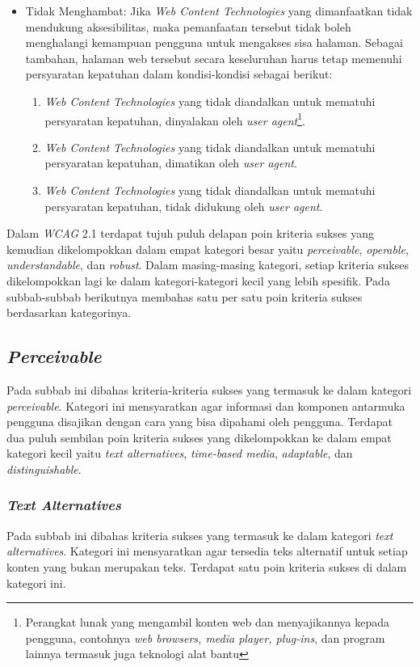 \begin{itemize}
	\item Tidak Menghambat: Jika \textit{Web Content Technologies} yang dimanfaatkan tidak mendukung aksesibilitas, maka pemanfaatan tersebut tidak boleh menghalangi kemampuan pengguna untuk mengakses sisa halaman. Sebagai tambahan, halaman web tersebut secara keseluruhan harus tetap memenuhi persyaratan kepatuhan dalam kondisi-kondisi sebagai berikut:
	\begin{enumerate}
		\item \textit{Web Content Technologies} yang tidak diandalkan untuk mematuhi persyaratan kepatuhan, dinyalakan oleh \textit{user agent}\footnote{Perangkat lunak yang mengambil konten web dan menyajikannya kepada pengguna, contohnya \textit{web browsers, media player, plug-ins}, dan program lainnya termasuk juga teknologi alat bantu}.
		\item \textit{Web Content Technologies} yang tidak diandalkan untuk mematuhi persyaratan kepatuhan, dimatikan oleh \textit{user agent}.
		\item \textit{Web Content Technologies} yang tidak diandalkan untuk mematuhi persyaratan kepatuhan, tidak didukung oleh \textit{user agent}.
	\end{enumerate}
\end{itemize}

Dalam \textit{WCAG} 2.1 terdapat tujuh puluh delapan poin kriteria sukses yang kemudian dikelompokkan dalam empat kategori besar yaitu \textit{perceivable}, \textit{operable}, \textit{understandable}, dan \textit{robust}. Dalam masing-masing kategori, setiap kriteria sukses dikelompokkan lagi ke dalam kategori-kategori kecil yang lebih spesifik. Pada subbab-subbab berikutnya membahas satu per satu poin kriteria sukses berdasarkan kategorinya.

\subsection{\textit{Perceivable}}
\label{sec:perceivable}
Pada subbab ini dibahas kriteria-kriteria sukses yang termasuk ke dalam kategori \textit{perceivable}. Kategori ini mensyaratkan agar informasi dan komponen antarmuka pengguna disajikan dengan cara yang bisa dipahami oleh pengguna. Terdapat dua puluh sembilan poin kriteria sukses yang dikelompokkan ke dalam empat kategori kecil yaitu \textit{text alternatives}, \textit{time-based media}, \textit{adaptable}, dan \textit{distinguishable}.

\subsubsection{\textit{Text Alternatives}}
\label{sec:text_alternatives}
Pada subbab ini dibahas kriteria sukses yang termasuk ke dalam kategori \textit{text alternatives}. Kategori ini mensyaratkan agar tersedia teks alternatif untuk setiap konten yang bukan merupakan teks. Terdapat satu poin kriteria sukses di dalam kategori ini.

